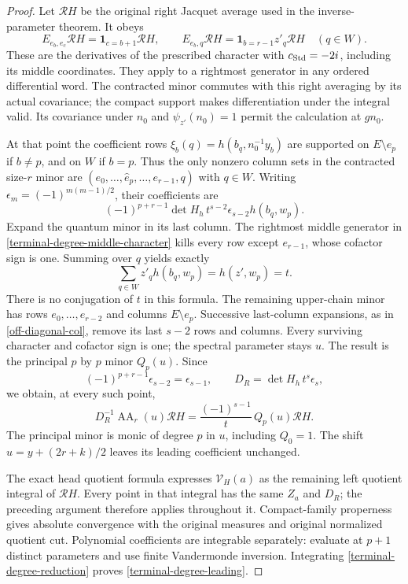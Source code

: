 \begin{proof}
Let $\mathcal RH$ be the original right Jacquet average used in
the inverse-parameter theorem.  It obeys
\begin{equation}\label{terminal-degree-middle-character}
 E_{e_b,e_c}\mathcal RH=\mathbf1_{c=b+1}\mathcal RH,
 \qquad
 E_{e_b,q}\mathcal RH=\mathbf1_{b=r-1}z'_q\mathcal RH
                   \quad(q\in W).
\end{equation}
These are the derivatives of the prescribed character with
$c_{\rm Std}=-2i$, including its middle coordinates.  They apply
to a rightmost generator in any ordered differential word.
The contracted minor commutes with this right averaging by its
actual covariance; the compact support makes differentiation under
the integral valid.  Its covariance under $n_0$ and
$\psi_{z'}(n_0)=1$ permit the calculation at $gn_0$.

At that point the coefficient rows $\xi_b(q)=h(b_q,n_0^{-1}y_b)$
are supported on $E\setminus e_p$ if $b\ne p$, and on $W$ if
$b=p$.  Thus the only nonzero column sets in the contracted
size-$r$ minor are
$(e_0,\ldots,\widehat e_p,\ldots,e_{r-1},q)$ with $q\in W$.
Writing $\epsilon_m=(-1)^{m(m-1)/2}$, their coefficients are
\[
  (-1)^{p+r-1}\det H_h\,t^{s-2}\epsilon_{s-2}
                                      h(b_q,w_p).
\]
Expand the quantum minor in its last column.  The rightmost
middle generator in \eqref{terminal-degree-middle-character}
kills every row except $e_{r-1}$, whose cofactor sign is one.
Summing over $q$ yields exactly
\[
               \sum_{q\in W}z'_q h(b_q,w_p)=h(z',w_p)=t.
\]
There is no conjugation of $t$ in this formula.  The remaining
upper-chain minor has rows $e_0,\ldots,e_{r-2}$ and columns
$E\setminus e_p$.  Successive last-column expansions, as in
\eqref{off-diagonal-col}, remove its last $s-2$ rows and columns.
Every surviving character and cofactor sign is one; the spectral
parameter stays $u$.  The result is the principal $p$ by $p$
minor $Q_p(u)$.  Since
\[
 (-1)^{p+r-1}\epsilon_{s-2}=\epsilon_{s-1},\qquad
 D_R=\det H_h\,t^s\epsilon_s,
\]
we obtain, at every such point,
\begin{equation}\label{terminal-degree-reduction}
       D_R^{-1}\operatorname{AA}_r(u)\mathcal RH
                       =\frac{(-1)^{s-1}}{t}\,Q_p(u)\mathcal RH.
\end{equation}
The principal minor is monic of degree $p$ in $u$, including
$Q_0=1$.  The shift $u=y+(2r+k)/2$ leaves its leading coefficient
unchanged.

The exact head quotient formula expresses $\mathcal V_H(a)$
as the remaining left quotient integral of $\mathcal RH$.
Every point in that integral has the same $Z_a$ and $D_R$;
the preceding argument therefore applies throughout it.
Compact-family properness gives absolute convergence with the
original measures and original normalized quotient cut.
Polynomial coefficients are integrable separately: evaluate at
$p+1$ distinct parameters and use finite Vandermonde inversion.
Integrating \eqref{terminal-degree-reduction} proves
\eqref{terminal-degree-leading}.


\end{proof}
